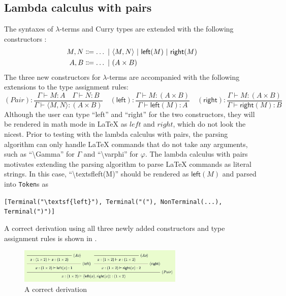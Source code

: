 \subsection{Lambda calculus with pairs}
The syntaxes of $\lambda$-terms and Curry types are extended with the following constructors \cite{van-bakel:2022}:
\begin{align*}
    M, N &\Coloneqq \ldots \ |\  \langle M, N \rangle \ |\  \textsf{left}(M) \ |\  \textsf{right}(M) \\
    A, B &\Coloneqq \ldots \ |\  (A \times B)
\end{align*}
The three new constructors for $\lambda$-terms are accompanied with the following extensions to the type assignment rules:
\[
    (\textit{Pair}): \frac{\Gamma \vdash M: A \quad \Gamma \vdash N: B}{\Gamma \vdash \langle M, N \rangle: (A \times B)} \quad (\textsf{left}): \frac{\Gamma \vdash M: (A \times B)}{\Gamma \vdash \textsf{left}(M): A} \quad (\textsf{right}): \frac{\Gamma \vdash M: (A \times B)}{\Gamma \vdash \textsf{right}(M): B} 
\]
Although the user can type ``left'' and ``right'' for the two constructors, they will be rendered in math mode in \LaTeX{} as $left$ and $right$, which do not look the nicest. Prior to testing with the lambda calculus with pairs, the parsing algorithm can only handle \LaTeX{} commands that do not take any arguments, such as ``\textbackslash Gamma'' for $\Gamma$ and ``\textbackslash varphi'' for $\varphi$. The lambda calculus with pairs motivates extending the parsing algorithm to parse \LaTeX{} commands as literal strings. In this case, ``\textbackslash textsf{left}(M)'' should be rendered as $\textsf{left}(M)$ and parsed into \lstinline{Token}s as
\begin{center}
    \lstinline|[Terminal("\textsf{left}"), Terminal("("), NonTerminal(...), Terminal(")")]|
\end{center}
A correct derivation using all three newly added constructors and type assignment rules is shown in .
\begin{figure}[!htbp]
    \centering
    \includegraphics[width=0.7\textwidth]{evaluation/lambda-with-pairs.png}
    \caption{A correct derivation }
    \label{evaluation:lambda-with-pairs}
\end{figure}

